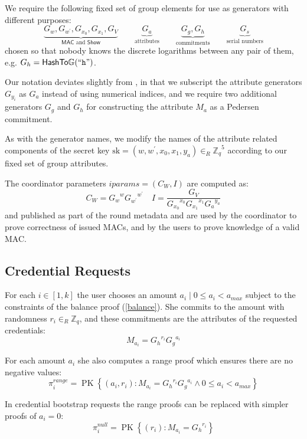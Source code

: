 \documentclass[a4paper]{article}
\begin{document}
We require the following fixed set of group elements for use as generators with different purposes:
\[
\underbrace{G_{w}, G_{w^{\prime}}, G_{x_{0}}, G_{x_{1}}, G_{V}}_{\mathsf{MAC} \text{~and~} \mathsf{Show}}
\qquad
\underbrace{G_a}_{\text{attributes}}
\qquad
\underbrace{G_g, G_h}_{\text{commitments}}
\qquad
\underbrace{G_s}_{\text{serial numbers}}
\]
chosen so that nobody knows the discrete logarithms between any pair of them, e.g. $G_h = \mathsf{HashTo\mathbb{G}}(``\texttt{h}")$.

Our notation deviates slightly from \cite{chase2019signal}, in that we subscript the attribute generators $G_{y_i}$ as $G_a$ instead of using numerical indices, and we require two additional generators $G_g$ and $G_h$ for constructing the attribute $M_a$ as a Pedersen commitment.

As with the generator names, we modify the names of the attribute related components of the secret key
$\mathrm{sk} = (w, w^{\prime}, x_{0}, x_{1}, y_{a}) \in_R {\mathbb{Z}_q}^5$
according to our fixed set of group attributes.

The coordinator parameters
$\mathit{iparams} =  (C_{W}, I)$
are computed as:
\[
C_{W}={G_w}^{w} {G_{w^\prime}}^{w^\prime}
\quad
I=\frac{G_{V}}{{G_{x_0}}^{x_0} {G_{x_1}}^{x_1} {G_a}^{y_a} }
\]
and published as part of the round metadata and are used by the coordinator to prove correctness of issued MACs, and by the users to prove knowledge of a valid MAC.

\subsection{Credential Requests}

For each $i \in [1, k]$ the user chooses an amount $a_i \mid 0 \leq a_i < a_{\mathit{max}}$ subject to the constraints of the balance proof (\cref{balance}). She commits to the amount with randomness $r_i \in_R \mathbb{Z}_q$, and these commitments are the attributes of the requested credentials:
\[ M_{a_i}={G_h}^{r_i}{G_g}^{a_i} \]

For each amount $a_i$ she also computes a range proof which ensures there are no negative values:
\[
\pi^{\mathit{range}}_i = \operatorname{PK}\left\{\left(a_i, r_i \right) :
M_{a_i} = {G_h}^{r_i}{G_g}^{a_i}
\land
0 \leq a_i < a_{\mathit{max}} \right\}
\]

In credential bootstrap requests the range proofs can be replaced with simpler proofs of $a_i = 0$:
\[
  \pi^{\mathit{null}}_i = \operatorname{PK}\left\{ \left( r_i\right) :
    M_{a_i} = {G_{h}}^{r_i}
  \right\}
\]
\end{document}
